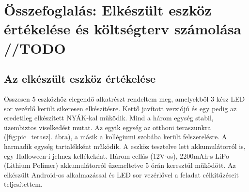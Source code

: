 \documentclass[../main.tex]{subfiles}
\begin{document}
\section{Összefoglalás: Elkészült eszköz értékelése és költségterv számolása //TODO}
    \subsection{Az elkészült eszköz értékelése}
        Összesen 5 eszközhöz elegendő alkatrészt rendeltem meg, amelyekből 3 kész LED sor vezérlő került sikeresen elkészítésre. Kettő javított verziójú és egy pedig az eredetileg elkészített NYÁK-kal működik. Mind a három egység stabil, üzembiztos viselkedést mutat. Az egyik egység az otthoni teraszunkra (\ref{fig:pic_terasz}. ábra), a másik a kollégiumi szobába került felszerelésre. A harmadik egység tartalékként működik. A eszköz tesztelve lett akkumulátorról is, egy Halloween-i jelmez kellékeként. Három cellás (12V-os), 2200mAh-s LiPo (Lithium Polimer) akkumulátorról üzemeltetve 5 órán keresztül működött. Az elkészült Android-os alkalmazással és LED sor vezérlővel a feladat célkitűzéseit teljesítettem.
    
\end{document}
